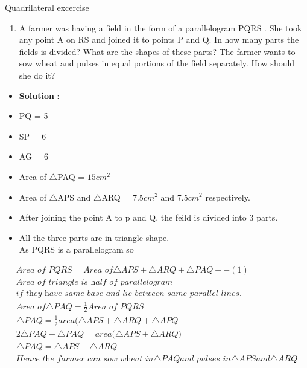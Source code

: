 \begin{frame}{Quadrilateral excercise}
\begin{enumerate}
\conti
\item A farmer was having a field in the form of a
parallelogram PQRS . She took any point A on
RS and joined it to points P and Q. In how
many parts the fields is divided? What are the
shapes of these parts? The farmer wants to sow
wheat and pulses in equal portions of the field
separately. How should she do it?
\seti
\end{enumerate}
\begin{itemize}
\item \textbf{Solution} :
\begin{center}

\end{center}
\end{itemize}
\end{frame}
\begin{frame}
\begin{itemize}
\item PQ = 5\\
\item SP = 6\\
\item AG = 6\\
\item Area of $\triangle$PAQ = $15cm^2$\\
\item Area of $\triangle$APS and $\triangle$ARQ = 7.5$cm^2$ and 7.5$cm^2$ respectively. 
\end{itemize}
\end{frame}
\begin{frame}
\begin{itemize}
\item  After joining the point A to p and Q, the feild is divided into 3 parts.\\
\item All the three parts are in triangle shape.\\
As PQRS is a parallelogram so\\
\end{itemize}
\begin{align*}
\textit{Area of PQRS} = \textit{Area of} \triangle{APS} + \triangle{ARQ} + \triangle{PAQ} --(1)\\
\textit{Area of triangle is half of parallelogram}\\\textit{if they have same base and lie between same parallel lines}. \\
\textit{Area of} \triangle{PAQ} = \frac{1}{2} \textit{Area of PQRS}\\
\triangle{PAQ} = \frac{1}{2}\textit{area}(\triangle{APS} + \triangle{ARQ} + \triangle{APQ}\\
2\triangle{PAQ} - \triangle{PAQ} = \textit{area(}\triangle{APS} + \triangle{ARQ}\textit{)}\\
\triangle{PAQ} = \triangle{APS} + \triangle{ARQ}\\
\textit{Hence the farmer can sow wheat in} \triangle{PAQ} \textit{and pulses in} \triangle{APS} and \triangle{ARQ}\\
\end{align*}
\end{frame}

